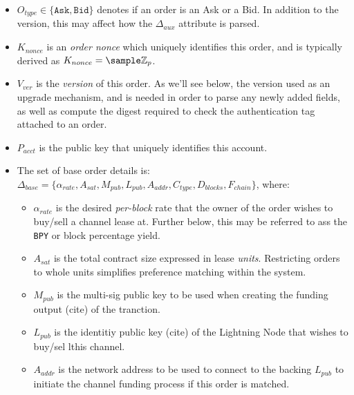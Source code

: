 \documentclass[12pt,a4paper]{article}
\theoremstyle{definition}
\begin{document}
\begin{itemize}
    \item $O_{type} \in \{\texttt{Ask}, \texttt{Bid}\}$ denotes if an order is
        an Ask or a Bid. In addition to the version, this may affect how the
        $\Delta_{aux}$ attribute is parsed.

    \item $K_{nonce}$ is an \emph{order nonce} which uniquely identifies this
        order, and is typically derived as $K_{nonce} = \sample
        \mathbb{Z}_{p}$.

    \item $V_{ver}$ is the \emph{version} of this order. As we'll see below,
        the version used as an upgrade mechanism, and is needed in order to
        parse any newly added fields, as well as compute the digest required to
        check the authentication tag attached to an order.

    \item $P_{acct}$ is the public key that uniquely identifies this account. 

    \item The set of base order details is: \\ $\Delta_{base} = \{
        \alpha_{rate}, A_{sat}, M_{pub}, L_{pub}, A_{addr}, C_{type},
    D_{blocks}, F_{chain} \}$, where:

    \begin{itemize}

        \item $\alpha_{rate}$ is the desired \emph{per-block} rate that the owner
            of the order wishes to buy/sell a channel lease at. Further below, this
            may be referred to ass the \texttt{BPY} or block percentage yield.

        \item $A_{sat}$ is the total contract size expressed in lease \emph{units}.
            Restricting orders to whole units simplifies preference matching within
            the system.

        \item $M_{pub}$ is the multi-sig public key to be used when creating
            the funding output (cite) of the tranction. %

        \item $L_{pub}$ is the identitiy public key (cite) of the Lightning
            Node that wishes to buy/sel lthis channel.

        \item $A_{addr}$ is the network address to be used to connect to the
            backing $L_{pub}$ to initiate the channel funding process if this
            order is matched. %


\end{itemize}
\end{itemize}
\end{document}
